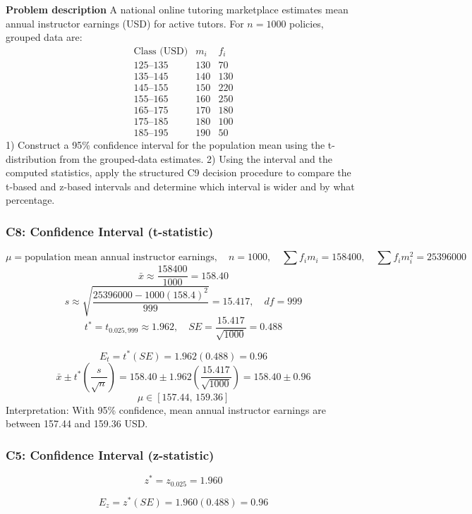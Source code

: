 \begin{ExamProblems}
		\newpage
		\item
		\textbf{Problem description}
		A national online tutoring marketplace estimates mean annual instructor earnings (USD) for active tutors.
		For $n=1000$ policies, grouped data are:
		\[
		\begin{array}{c|c|c}
		\text{Class (USD)} & m_i & f_i\\\hline
		125\text{--}135 & 130 & 70\\
		135\text{--}145 & 140 & 130\\
		145\text{--}155 & 150 & 220\\
		155\text{--}165 & 160 & 250\\
		165\text{--}175 & 170 & 180\\
		175\text{--}185 & 180 & 100\\
		185\text{--}195 & 190 & 50
		\end{array}
		\]
		1) Construct a 95\% confidence interval for the population mean using the t-distribution from the grouped-data estimates.
		2) Using the interval and the computed statistics, apply the structured C9 decision procedure to compare the t-based and z-based intervals and determine which interval is wider and by what percentage.

		\subsubsection*{C8: Confidence Interval (t-statistic)}
		\[
		\mu=\text{population mean annual instructor earnings},\quad n=1000,\quad \sum f_im_i=158400,\quad \sum f_im_i^2=25396000
		\]
		\[
		\bar{x}\approx\frac{158400}{1000}=158.40
		\]
		\[
		s\approx\sqrt{\frac{25396000-1000(158.4)^2}{999}}=15.417,\quad df=999
		\]
		\[
		t^*=t_{0.025,999}\approx 1.962,\quad SE=\frac{15.417}{\sqrt{1000}}=0.488
		\]

		\[
		E_t=t^*(SE)=1.962(0.488)=0.96
		\]
		\[
		\bar{x}\pm t^*\left(\frac{s}{\sqrt{n}}\right)=158.40\pm 1.962\left(\frac{15.417}{\sqrt{1000}}\right)=158.40\pm 0.96
		\]
		\[
		\mu\in[157.44,\,159.36]
		\]
		Interpretation: With 95\% confidence, mean annual instructor earnings are between 157.44 and 159.36 USD.

		\subsubsection*{C5: Confidence Interval (z-statistic)}
		\[
		z^*=z_{0.025}=1.960
		\]

		\[
		E_z=z^*(SE)=1.960(0.488)=0.96
		\]


\end{ExamProblems}
